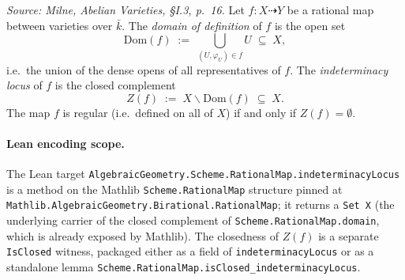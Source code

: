 \begin{definition}


  \label{def:indeterminacy_locus}
  \textit{Source: Milne, \emph{Abelian Varieties}, \S I.3, p.~16.}
  Let \(f \colon X \dashrightarrow Y\) be a rational map between varieties over \(\bar k\).
  The \emph{domain of definition} of \(f\) is the open set
  \[
    \mathrm{Dom}(f) \;:=\; \bigcup_{(U, \varphi_U) \in f} U \;\subseteq\; X,
  \]
  i.e.\ the union of the dense opens of all representatives of \(f\). The
  \emph{indeterminacy locus} of \(f\) is the closed complement
  \[
    Z(f) \;:=\; X \smallsetminus \mathrm{Dom}(f) \;\subseteq\; X.
  \]
  The map \(f\) is regular (i.e.\ defined on all of \(X\)) if and only if \(Z(f) = \emptyset\).

  \paragraph{Lean encoding scope.} The Lean target
  \texttt{AlgebraicGeometry.Scheme.RationalMap.indeterminacyLocus} is a method on the
  Mathlib \texttt{Scheme.RationalMap} structure pinned at
  \texttt{Mathlib.AlgebraicGeometry.Birational.RationalMap}; it returns a
  \texttt{Set X} (the underlying carrier of the closed complement of
  \texttt{Scheme.RationalMap.domain}, which is already exposed by Mathlib). The
  closedness of \(Z(f)\) is a separate \texttt{IsClosed} witness, packaged either as a
  field of \texttt{indeterminacyLocus} or as a standalone lemma
  \texttt{Scheme.RationalMap.isClosed\_indeterminacyLocus}.
\end{definition}



